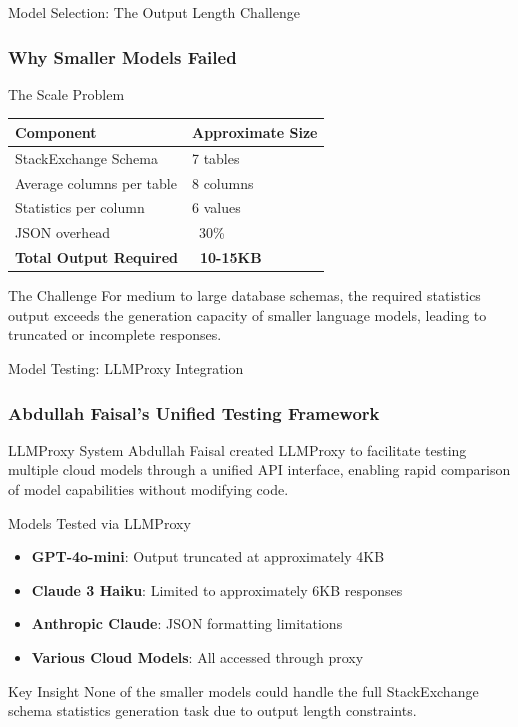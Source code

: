 \documentclass[smaller]{beamer}
\begin{document}
\begin{frame}{Model Selection: The Output Length Challenge}
\frametitle{Why Smaller Models Failed}

\begin{block}{The Scale Problem}
\begin{tabular}{ll}
\toprule
Component & Approximate Size \\
\midrule
StackExchange Schema & 7 tables \\
Average columns per table & 8 columns \\
Statistics per column & 6 values \\
JSON overhead & ~30\% \\
\textbf{Total Output Required} & \textbf{~10-15KB} \\
\bottomrule
\end{tabular}
\end{block}

\begin{alertblock}{The Challenge}
For medium to large database schemas, the required statistics output exceeds the generation capacity of smaller language models, leading to truncated or incomplete responses.
\end{alertblock}

\end{frame}

\begin{frame}{Model Testing: LLMProxy Integration}
\frametitle{Abdullah Faisal's Unified Testing Framework}

\begin{block}{LLMProxy System}
Abdullah Faisal created LLMProxy to facilitate testing multiple cloud models through a unified API interface, enabling rapid comparison of model capabilities without modifying code.
\end{block}

\begin{exampleblock}{Models Tested via LLMProxy}
\begin{itemize}
    \item \textbf{GPT-4o-mini}: Output truncated at approximately 4KB
    \item \textbf{Claude 3 Haiku}: Limited to approximately 6KB responses
    \item \textbf{Anthropic Claude}: JSON formatting limitations
    \item \textbf{Various Cloud Models}: All accessed through proxy
\end{itemize}
\end{exampleblock}

\begin{alertblock}{Key Insight}
None of the smaller models could handle the full StackExchange schema statistics generation task due to output length constraints.
\end{alertblock}

\end{frame}
\end{document}
